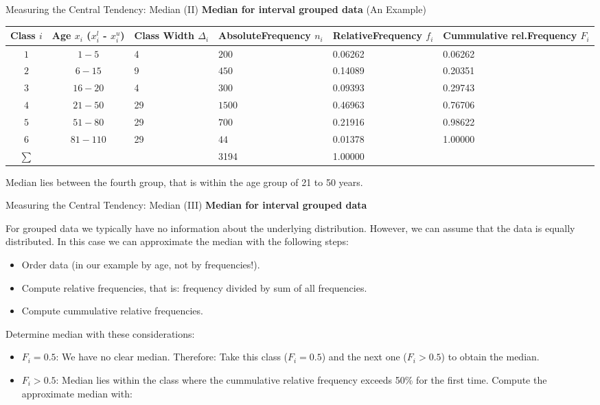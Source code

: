 \begin{frame}{Measuring the Central Tendency: Median (II)}
  \textbf{Median for interval grouped data} (An Example)
  \begin{table}
    \begin{tabularx}{\textwidth}{|c|c|p{4.5em}|X|X|X|}
      \rowcolor{faugray!62}\textbf{Class $i$} & \textbf{Age $x_i$} ($x_i^l$ - $x_i^u$) & \textbf{Class Width $\Delta_i$} & \textbf{Absolute\newline Frequency $n_i$} & \textbf{Relative\newline Frequency $f_i$} & \textbf{Cummulative rel.\newline Frequency $F_i$}\\ \hline
      $1$ & $1-5$ & 4 & $200$ &  0.06262  & 0.06262\\
      $2$ & $6-15$ & 9  & $450$ & 0.14089 & 0.20351\\
      $3$ & $16-20$ & 4 & $300$ & 0.09393 & 0.29743\\
      \rowcolor{fauyellow!62} $4$ & $21-50$ & 29 & $1500$ & 0.46963 & 0.76706\\
      $5$ & $51-80$ &  29 & $700$ &  0.21916 & 0.98622\\
      $6$ & $81-110$ & 29 & $44$ & 0.01378	& 1.00000 \\ \hline
      $\sum$ & & & 3194 & 1.00000 & \\ \hline
    \end{tabularx}
  \end{table}

  Median lies between the fourth group, that is within the age group of 21 to 50 years.
\end{frame}

\begin{frame}{Measuring the Central Tendency: Median (III)}
  \textbf{Median for interval grouped data}

  For grouped data we typically have no information about the underlying
  distribution. However, we can assume that the data is equally
  distributed. In this case we can approximate the median with the following
  steps:
  \begin{itemize}
  \item Order data (in our example by age, not by frequencies!).
  \item Compute relative frequencies, that is: frequency divided by sum of all frequencies.
  \item Compute cummulative relative frequencies.
  \end{itemize}

  Determine median with these considerations:
  \begin{itemize}
  \item $F_i=0.5$: We have no clear median. Therefore: Take this class ($F_i=0.5$) and the next one ($F_i > 0.5$) to obtain the median.
  \item $F_i>0.5$: Median lies within the class where the cummulative
    relative frequency exceeds 50\% for the first time. Compute the approximate median with:
  \end{itemize}
\end{frame}

